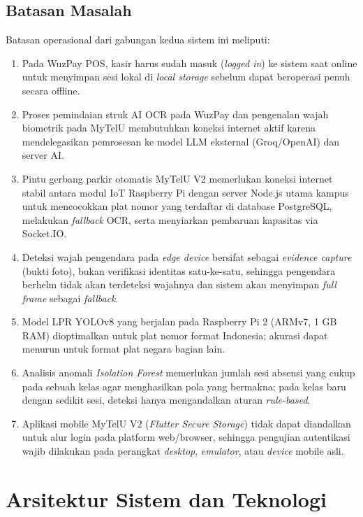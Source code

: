 \documentclass[12pt,titlepage,a4paper]{report}
\begin{document}
\section{Batasan Masalah}
Batasan operasional dari gabungan kedua sistem ini meliputi:
\begin{enumerate}
    \item Pada WuzPay POS, kasir harus sudah masuk (\textit{logged in}) ke sistem saat online untuk menyimpan sesi lokal di \textit{local storage} sebelum dapat beroperasi penuh secara offline.
    \item Proses pemindaian struk AI OCR pada WuzPay dan pengenalan wajah biometrik pada MyTelU membutuhkan koneksi internet aktif karena mendelegasikan pemrosesan ke model LLM eksternal (Groq/OpenAI) dan server AI.
    \item Pintu gerbang parkir otomatis MyTelU V2 memerlukan koneksi internet stabil antara modul IoT Raspberry Pi dengan server Node.js utama kampus untuk mencocokkan plat nomor yang terdaftar di database PostgreSQL, melakukan \textit{fallback} OCR, serta menyiarkan pembaruan kapasitas via Socket.IO.
    \item Deteksi wajah pengendara pada \textit{edge device} bersifat sebagai \textit{evidence capture} (bukti foto), bukan verifikasi identitas satu-ke-satu, sehingga pengendara berhelm tidak akan terdeteksi wajahnya dan sistem akan menyimpan \textit{full frame} sebagai \textit{fallback}.
    \item Model LPR YOLOv8 yang berjalan pada Raspberry Pi 2 (ARMv7, 1 GB RAM) dioptimalkan untuk plat nomor format Indonesia; akurasi dapat menurun untuk format plat negara bagian lain.
    \item Analisis anomali \textit{Isolation Forest} memerlukan jumlah sesi absensi yang cukup pada sebuah kelas agar menghasilkan pola yang bermakna; pada kelas baru dengan sedikit sesi, deteksi hanya mengandalkan aturan \textit{rule-based}.
    \item Aplikasi mobile MyTelU V2 (\textit{Flutter Secure Storage}) tidak dapat diandalkan untuk alur login pada platform web/browser, sehingga pengujian autentikasi wajib dilakukan pada perangkat \textit{desktop}, \textit{emulator}, atau \textit{device} mobile asli.
\end{enumerate}


\chapter{Arsitektur Sistem dan Teknologi}
\end{document}
